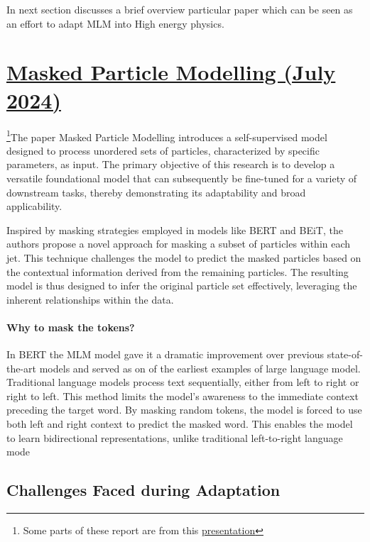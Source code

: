 \documentclass[letterpaper,12pt]{article}
\begin{document}
\begin{spacing}{1.125}
In next section discusses a brief overview particular paper which can be seen as
an effort to adapt MLM into High energy physics.

\pagebreak
\section{\href{https://arxiv.org/abs/2401.13537}{Masked Particle Modelling (July 2024)}}

\footnote{Some parts of these report are from this
\href{https://github.com/abhiramtilakiiit/research/blob/main/presentations/seminar/main.pdf,
please refer to it for a more detailed explantion involving analysing results
and more information about the training procedure}{presentation}}The paper Masked Particle Modelling introduces a self-supervised model designed to process unordered sets of particles, characterized by specific parameters, as input. The primary objective of this research is to develop a versatile foundational model that can subsequently be fine-tuned for a variety of downstream tasks, thereby demonstrating its adaptability and broad applicability.

Inspired by masking strategies employed in models like BERT and BEiT, the authors propose a novel approach for masking a subset of particles within each jet. This technique challenges the model to predict the masked particles based on the contextual information derived from the remaining particles. The resulting model is thus designed to infer the original particle set effectively, leveraging the inherent relationships within the data.

\paragraph{Why to mask the tokens?}
In BERT the MLM model gave it a dramatic
improvement over previous state-of-the-art models and served as on of the
earliest examples of large language model.
Traditional language models process text sequentially, either from left to right
or right to left. This method limits the model’s awareness to the immediate
context preceding the target word.
By masking random tokens, the model is forced to use both left and right
context to predict the masked word. This enables the model to learn
bidirectional representations, unlike traditional left-to-right language mode

\subsection{Challenges Faced during Adaptation}



\end{spacing}
\end{document}
